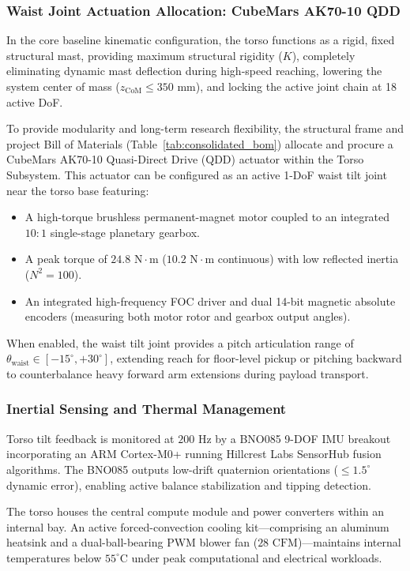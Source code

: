 \subsubsection{Waist Joint Actuation Allocation: CubeMars AK70-10 QDD}
In the core baseline kinematic configuration, the torso functions as a rigid, fixed structural mast, providing maximum structural rigidity ($K$), completely eliminating dynamic mast deflection during high-speed reaching, lowering the system center of mass ($z_{\text{CoM}} \le 350\text{ mm}$), and locking the active joint chain at 18 active DoF. 

To provide modularity and long-term research flexibility, the structural frame and project Bill of Materials (Table~\ref{tab:consolidated_bom}) allocate and procure a CubeMars AK70-10 Quasi-Direct Drive (QDD) actuator within the Torso Subsystem. This actuator can be configured as an active 1-DoF waist tilt joint near the torso base featuring:
\begin{itemize}[leftmargin=1.5em]
  \item A high-torque brushless permanent-magnet motor coupled to an integrated $10:1$ single-stage planetary gearbox.
  \item A peak torque of $24.8\text{ N}\cdot\text{m}$ ($10.2\text{ N}\cdot\text{m}$ continuous) with low reflected inertia ($N^2 = 100$).
  \item An integrated high-frequency FOC driver and dual 14-bit magnetic absolute encoders (measuring both motor rotor and gearbox output angles).
\end{itemize}
When enabled, the waist tilt joint provides a pitch articulation range of $\theta_{\text{waist}} \in [-15^\circ, +30^\circ]$, extending reach for floor-level pickup or pitching backward to counterbalance heavy forward arm extensions during payload transport.

\subsubsection{Inertial Sensing and Thermal Management}
Torso tilt feedback is monitored at $200\text{ Hz}$ by a BNO085 9-DOF IMU breakout incorporating an ARM Cortex-M0+ running Hillcrest Labs SensorHub fusion algorithms. The BNO085 outputs low-drift quaternion orientations ($\le 1.5^\circ$ dynamic error), enabling active balance stabilization and tipping detection.

The torso houses the central compute module and power converters within an internal bay. An active forced-convection cooling kit---comprising an aluminum heatsink and a dual-ball-bearing PWM blower fan ($28\text{ CFM}$)---maintains internal temperatures below $55^\circ\text{C}$ under peak computational and electrical workloads.

